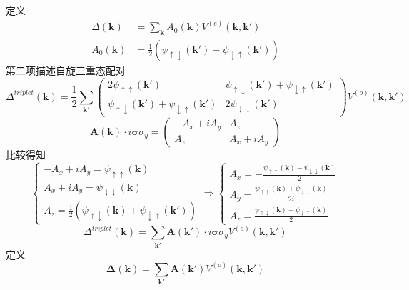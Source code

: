 \documentclass{article}
\numberwithin{equation}{subsection}
\newcommand{\mk}{\mathbf{k}}
\newcommand{\msigma}{\bm{\sigma}}
\newcommand{\mDelta}{\bm{\Delta}}
\begin{document}
定义
\begin{equation}
    \begin{split}
        \Delta(\mk)&=\sum_{\mk}A_{0}(\mk)V^{(e)}(\mk,\mk')\\
        A_0(\mk)&=\frac{1}{2}(\psi_{\uparrow\downarrow}(\mk')-\psi_{\downarrow\uparrow}(\mk'))
    \end{split}
\end{equation}
第二项描述自旋三重态配对
\begin{equation}
    \Delta^{triplet}(\mk)=\frac{1}{2}\sum_{\mk'}\begin{pmatrix}
        2\psi_{\uparrow\uparrow}(\mk')&\psi_{\uparrow\downarrow}(\mk')+\psi_{\downarrow\uparrow}(\mk')\\
        \psi_{\uparrow\downarrow}(\mk')+\psi_{\downarrow\uparrow}(\mk')&2\psi_{\downarrow\downarrow}(\mk')
    \end{pmatrix}V^{(o)}(\mk,\mk')
\end{equation}
\begin{equation}
    \mathbf{A}(\mk)\cdot i\msigma\sigma_y=\begin{pmatrix}
        -A_x+iA_y&A_z\\
        A_z&A_x+iA_y
    \end{pmatrix}
\end{equation}
比较得知
\begin{equation}
    \begin{cases}
        -A_x+iA_y=\psi_{\uparrow\uparrow}(\mk)\\
        A_x+iA_y=\psi_{\downarrow\downarrow}(\mk)\\
        A_z=\frac{1}{2}(\psi_{\uparrow\downarrow}(\mk)+\psi_{\downarrow\uparrow}(\mk'))
    \end{cases}\Longrightarrow\begin{cases}
        A_x=-\frac{\psi_{\uparrow\uparrow}(\mk)-\psi_{\downarrow\downarrow}(\mk)}{2}\\
        A_y=\frac{\psi_{\uparrow\uparrow}(\mk)+\psi_{\downarrow\downarrow}(\mk)}{2i}\\
        A_z=\frac{\psi_{\uparrow\downarrow}(\mk)+\psi_{\downarrow\uparrow}(\mk)}{2}
    \end{cases}
\end{equation}
\begin{equation}
    \Delta^{triplet}(\mk)=\sum_{\mk'}\mathbf{A}(\mk')\cdot i\msigma\sigma_y V^{(o)}(\mk,\mk')
\end{equation}
定义
\begin{equation}
    \mDelta(\mk)=\sum_{\mk'}\mathbf{A}(\mk')V^{(o)}(\mk,\mk')
\end{equation}
\end{document}
